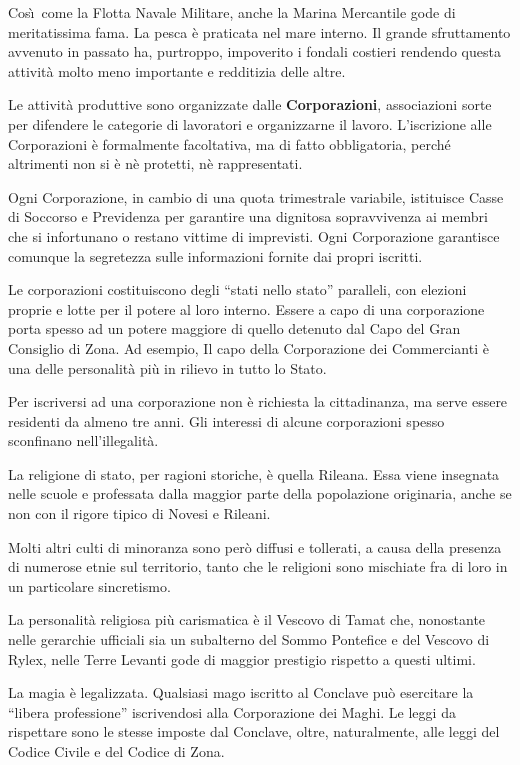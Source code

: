 Cos\`\i\  come la Flotta Navale Militare, anche la Marina Mercantile gode
di meritatissima fama. La pesca \`e praticata nel mare interno.  Il
grande sfruttamento avvenuto in passato ha, purtroppo, impoverito i
fondali costieri rendendo questa attivit\`a molto meno importante e
redditizia delle altre.

Le attivit\`a produttive sono organizzate dalle \textbf{Corporazioni},
associazioni sorte per difendere le categorie di lavoratori e
organizzarne il lavoro. L'iscrizione alle Corporazioni \`e formalmente
facoltativa, ma di fatto obbligatoria, perch\'e altrimenti non si \`e
n\`e protetti, n\`e rappresentati.

\iffullversion
Ogni Corporazione, in cambio di una quota trimestrale variabile,
istituisce Casse di Soccorso e Previdenza per garantire una dignitosa
sopravvivenza ai membri che si infortunano o restano vittime di
imprevisti. Ogni Corporazione garantisce comunque la segretezza sulle
informazioni fornite dai propri iscritti.

Le corporazioni costituiscono degli ``stati nello stato'' paralleli,
con elezioni proprie e lotte per il potere al loro interno. Essere a
capo di una corporazione porta spesso ad un potere maggiore di quello
detenuto dal Capo del Gran Consiglio di Zona. Ad esempio, Il capo
della Corporazione dei Commercianti \`e una delle personalit\`a pi\`u
in rilievo in tutto lo Stato.

Per iscriversi ad una corporazione non \`e richiesta la cittadinanza,
ma serve essere residenti da almeno tre anni. Gli interessi di alcune
corporazioni spesso sconfinano nell'illegalit\`a.
\fi

\Religione La religione di stato, per ragioni storiche, \`e quella
Rileana. Essa viene insegnata nelle scuole e professata dalla maggior
parte della popolazione originaria, anche se non con il rigore tipico
di Novesi e Rileani.

\iffullversion
Molti altri culti di minoranza sono per\`o diffusi e tollerati, a
causa della presenza di numerose etnie sul territorio, tanto che le
religioni sono mischiate fra di loro in un particolare sincretismo.

La personalit\`a religiosa pi\`u carismatica \`e il Vescovo di Tamat
che, nonostante nelle gerarchie ufficiali sia un subalterno del Sommo
Pontefice e del Vescovo di Rylex, nelle Terre Levanti gode di maggior
prestigio rispetto a questi ultimi.
\fi

\Magia La magia \`e legalizzata. Qualsiasi mago iscritto al Conclave
pu\`o esercitare la ``libera professione'' iscrivendosi alla
Corporazione dei Maghi. Le leggi da rispettare sono le stesse imposte
dal Conclave, oltre, naturalmente, alle leggi del Codice Civile e del
Codice di Zona.

